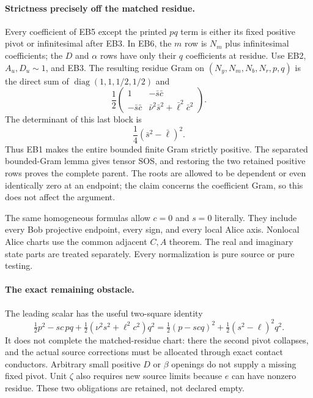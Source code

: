 \paragraph{Strictness precisely off the matched residue.}
Every coefficient of EB5 except the printed $pq$ term is either
its fixed positive pivot or infinitesimal after EB3. In EB6, the
$m$ row is $N_m$ plus infinitesimal coefficients; the $D$ and
$\alpha$ rows have only their $q$ coefficients at residue.
Use EB2, $A_u,D_u\sim1$, and EB3. The resulting residue Gram on
$(N_y,N_m,N_b,N_r,p,q)$ is the direct sum of
$\operatorname{diag}(1,1,1/2,1/2)$ and
\[
 \frac12
 \begin{pmatrix}
 1&-\bar s\bar c\\
 -\bar s\bar c&\bar\nu^2\bar s^2+\bar\ell^2\bar c^2
 \end{pmatrix}.                                                \tag{EB8}
\]
The determinant of this last block is
\[
             \frac14(\bar s^2-\bar\ell)^2.                    \tag{EB9}
\]
Thus EB1 makes the entire bounded finite Gram strictly positive.
The separated bounded-Gram lemma gives tensor SOS, and restoring the
two retained positive rows proves the complete parent. The roots are
allowed to be dependent or even identically zero at an endpoint; the
claim concerns the coefficient Gram, so this does not affect the
argument.

The same homogeneous formulas allow $c=0$ and $s=0$ literally.
They include every Bob projective endpoint, every sign, and every
local Alice axis. Nonlocal Alice charts use the common adjacent
$C,A$ theorem. The real and imaginary state parts are treated
separately. Every normalization is pure source or pure testing.

\paragraph{The exact remaining obstacle.}
The leading scalar has the useful two-square identity
\[
 \tfrac12p^2-sc\,pq
 +\tfrac12(\nu^2s^2+\ell^2c^2)q^2
 =\tfrac12(p-scq)^2+\tfrac12(s^2-\ell)^2q^2.                  \tag{EB10}
\]
It does not complete the matched-residue chart: there the second
pivot collapses, and the actual source corrections must be allocated
through exact contact conductors. Arbitrary small positive $D$ or
$\beta$ openings do not supply a missing fixed pivot. Unit $\zeta$
also requires new source limits because $e$ can have nonzero residue.
These two obligations are retained, not declared empty.



